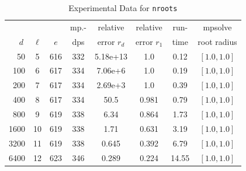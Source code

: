 \documentclass[runningheads]{llncs}
\begin{document}
\begin{table}
\caption{Experimental Data for \texttt{nroots}} %
\label{tab:nroots}
\vskip -0.15in
\begin{center}
\begin{small}
\begin{sc}
\begin{tabular}{rccccccc}
\toprule
&  &  & mp.-& relative  & relative & run- & mpsolve \\
$d~$& $\ell$& $e$ & dps&error $r_d$       & error $r_1$ &time& root radius\\
\midrule
 50 & 5 & 616 & 332 & 5.18e+13 & 1.0 & 0.12 & $[1.0, 1.0]$\\
 100 & 6 & 617 & 334 & 7.06e+6 & 1.0 & 0.19 & $[1.0, 1.0]$\\
 200 & 7 & 617 & 334 & 2.69e+3 & 1.0 & 0.39 & $[1.0, 1.0]$\\
 400 & 8 & 617 & 334 & 50.5 & 0.981 & 0.79 & $[1.0, 1.0]$\\
 800 & 9 & 619 & 338 & 6.34 & 0.864 & 1.73 & $[1.0, 1.0]$\\
 1600 & 10 & 619 & 338 & 1.71 & 0.631 & 3.19 & $[1.0, 1.0]$\\
 3200 & 11 & 619 & 338 & 0.645 & 0.392 & 6.79 & $[1.0, 1.0]$\\
 6400 & 12 & 623 & 346 & 0.289 & 0.224 & 14.55 & $[1.0, 1.0]$\\
\bottomrule
\end{tabular}
\end{sc}
\end{small}
\end{center}
\vskip 0.05in
\end{table}
\end{document}
